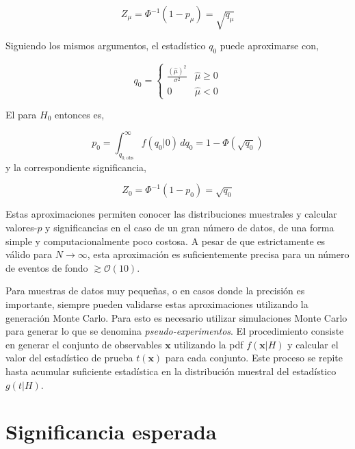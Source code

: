 \begin{equation}
  Z_\mu = \Phi^{-1}(1-p_\mu) = \sqrt{q_\mu}
\end{equation}

Siguiendo los mismos argumentos, el estadístico $q_0$ puede aproximarse con,

\begin{equation}
  q_0 =
  \begin{cases}
    \frac{(\hat{\mu})^2}{\sigma^2} & \hat{\mu} \geq 0 \\
    0 & \hat{\mu} < 0
  \end{cases}
\end{equation}

El {\pvalue} para $H_0$ entonces es,

\begin{equation}
  p_0 = \int_{q_{0,\text{obs}}}^{\infty} f(q_0|0) \, dq_0 = 1 - \Phi(\sqrt{q_0})
\end{equation}
%
y la correspondiente significancia,

\begin{equation}
  Z_0 = \Phi^{-1} (1-p_0) = \sqrt{q_0}
\end{equation}

Estas aproximaciones permiten conocer las distribuciones muestrales y calcular
valores-$p$ y significancias en el caso de un gran número de datos, de una forma
simple y computacionalmente poco costosa. A pesar de que estrictamente es válido
para $N\to\infty$, esta aproximación es suficientemente precisa para un número
de eventos de fondo $\gtrsim \mathcal{O}(10)$.

Para muestras de datos muy pequeñas, o en casos donde la precisión es
importante, siempre pueden validarse estas aproximaciones utilizando la
generación Monte Carlo.
Para esto es necesario utilizar simulaciones Monte Carlo para generar lo que se
denomina \emph{pseudo-experimentos}. El procedimiento consiste en generar el
conjunto de observables $\bm{x}$ utilizando la pdf $f(\bm{x}|H)$ y calcular el
valor del estadístico de prueba $t(\bm{x})$ para cada conjunto. Este proceso se
repite hasta acumular suficiente estadística en la distribución muestral del
estadístico $g(t|H)$.



\section{Significancia esperada}


